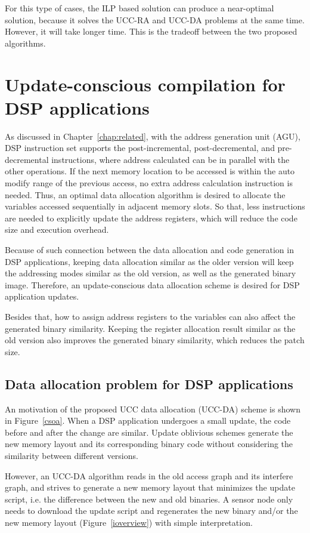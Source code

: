 For this type of cases, the ILP based solution can produce a near-optimal solution, 
because it solves the UCC-RA and UCC-DA problems at the same time. However, it will
take longer time. This is the tradeoff between the two proposed algorithms.

\section{Update-conscious compilation for DSP applications}

As discussed in Chapter~\ref{chap:related}, with the address generation unit (AGU), DSP instruction set supports the post-incremental, post-decremental, and pre-decremental instructions,  where address calculated can be in parallel with the other operations. If the next memory location to be accessed is within the auto modify range of the previous access,
no extra address calculation instruction is needed.
Thus, an optimal data allocation algorithm is desired to allocate the variables accessed sequentially in adjacent memory slots. So that, less instructions are needed to explicitly update the address registers, which will reduce the code size and execution overhead.

Because of such connection between the data allocation and code generation in DSP applications, keeping data allocation similar as the older version will keep the addressing modes similar as the old version,
as well as the generated binary image. Therefore, an update-conscious data allocation scheme is desired for DSP application updates.

Besides that, how to assign address registers to the variables can also affect the generated binary similarity.
Keeping the register allocation result similar as the old version also improves the generated binary similarity, which reduces the patch size.

\subsection{Data allocation problem for DSP applications}

An motivation of the proposed UCC data allocation (UCC-DA) scheme is shown in  Figure~\ref{csoa}. When a DSP application undergoes a small update, the code before and after the change are similar. Update oblivious schemes generate the new memory layout and its corresponding binary code without considering the similarity between different versions. 

However, an UCC-DA algorithm reads in the old access graph and its interfere graph, and strives to generate a new memory layout that minimizes the update script, i.e. the difference between the new and old binaries. A sensor node only needs to download the update script and regenerates the new binary and/or the new memory layout (Figure~\ref{ioverview}) with simple interpretation.

